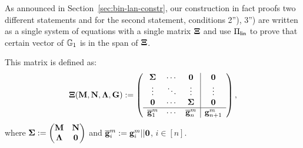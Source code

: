 

As announced in Section~\ref{sec:bin-lan-constr}, our construction in fact proofs two different statements and for the second statement, conditions 2''), 3'') are written as a single system of equations with a single matrix $\mathbf{{\Xi}}$ and use $\Pi_{\mathsf{lin}}$ to prove that certain vector of $\mathbb{G}_1$ is in the span of $\mathbf{{\Xi}}$.

This matrix is defined as:
$$\mathbf{{\Xi}}(\mathbf{{M}},\mathbf{{N}},\mathbf{{\Lambda}},\mathbf{{G}}):=
\left(\begin{array}{ccc|ccc}
\mathbf{{\Sigma}}             & \cdots & \mathbf{{0}}                  & \mathbf{{0}} \\
\vdots                    & \ddots & \vdots                    & \vdots   \\
\mathbf{{0}}                  & \cdots & \mathbf{{\Sigma}}             & \mathbf{{0}} \\
\hline
\overline{\mathbf{g}}_1^{m} & \cdots & \overline{\mathbf{g}}_n^{m} & \mathbf{g}_{n+1}^{m}
\end{array}\right),
$$ where $\mathbf{{\Sigma}}:=\begin{pmatrix}
    \mathbf{{M}}       & \mathbf{{N}}\\
    \mathbf{{\Lambda}} & \mathbf{{0}}
\end{pmatrix}$ and
 $\overline{\mathbf{g}}_i^{m}:=\mathbf{g}_i^{m}||\mathbf{0}$, $i\in[n]$. 
 
